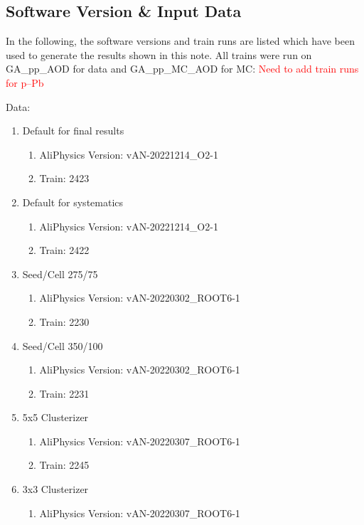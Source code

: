\documentclass[ALICE]{ALICE_analysis_notes}
\newcommand{\pPb}{{\mbox{p--Pb}}\xspace}
\begin{document}
\begin{appendix}

\clearpage{}\section{Software Version \& Input Data}
\label{sec:software}
In the following, the software versions and train runs are listed which have been used to generate the results shown in this note. All trains were run on GA\_pp\_AOD for data and GA\_pp\_MC\_AOD for MC: \textcolor{red}{Need to add train runs for \pPb}

Data:
\begin{enumerate}
    \item Default for final results
    \begin{enumerate}
        \item AliPhysics Version: vAN-20221214\_O2-1
        \item Train: 2423
    \end{enumerate}
    \item Default for systematics
    \begin{enumerate}
        \item AliPhysics Version: vAN-20221214\_O2-1
        \item Train: 2422
    \end{enumerate}
    \item Seed/Cell 275/75
    \begin{enumerate}
        \item AliPhysics Version: vAN-20220302\_ROOT6-1
        \item Train: 2230
    \end{enumerate}
    \item Seed/Cell 350/100
    \begin{enumerate}
        \item AliPhysics Version: vAN-20220302\_ROOT6-1
        \item Train: 2231
    \end{enumerate}
    \item 5x5 Clusterizer
    \begin{enumerate}
        \item AliPhysics Version: vAN-20220307\_ROOT6-1
        \item Train: 2245
    \end{enumerate}
    \item 3x3 Clusterizer
    \begin{enumerate}
        \item AliPhysics Version: vAN-20220307\_ROOT6-1

\end{enumerate}
\end{enumerate}
\end{appendix}
\end{document}
